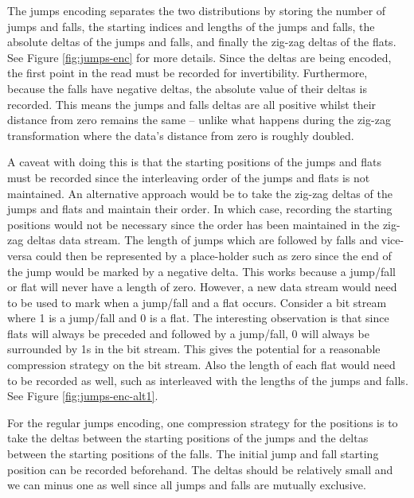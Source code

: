The jumps encoding separates the two distributions by storing the number of
jumps and falls, the starting indices and lengths of the jumps and falls, the
absolute deltas of the jumps and falls, and finally the zig-zag deltas of the
flats. See Figure \ref{fig:jumps-enc} for more details. Since the deltas are
being encoded, the first point in the read must be recorded for invertibility.
Furthermore, because the falls have negative deltas, the absolute value of their
deltas is recorded. This means the jumps and falls deltas are all positive
whilst their distance from zero remains the same -- unlike what happens during
the zig-zag transformation where the data's distance from zero is roughly
doubled.



A caveat with doing this is that the starting positions of the jumps and flats
must be recorded since the interleaving order of the jumps and flats is not
maintained. An alternative approach would be to take the zig-zag deltas of the
jumps and flats and maintain their order. In which case, recording the starting
positions would not be necessary since the order has been maintained in the
zig-zag deltas data stream. The length of jumps which are followed by falls and
vice-versa could then be represented by a place-holder such as zero since the
end of the jump would be marked by a negative delta. This works because a
jump/fall or flat will never have a length of zero. However, a new data stream
would need to be used to mark when a jump/fall and a flat occurs. Consider a bit
stream where 1 is a jump/fall and 0 is a flat. The interesting observation is
that since flats will always be preceded and followed by a jump/fall, 0 will
always be surrounded by 1s in the bit stream. This gives the potential for
a reasonable compression strategy on the bit stream. Also the length of each
flat would need to be recorded as well, such as interleaved with the lengths of
the jumps and falls. See Figure \ref{fig:jumps-enc-alt1}.



For the regular jumps encoding, one compression strategy for the positions is to
take the deltas between the starting positions of the jumps and the deltas
between the starting positions of the falls. The initial jump and fall starting
position can be recorded beforehand. The deltas should be relatively small and
we can minus one as well since all jumps and falls are mutually exclusive.

